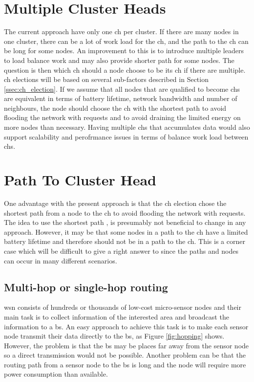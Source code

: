\documentclass[USenglish]{uit-thesis}
\begin{document}
\section{Multiple Cluster Heads} \label{disc:multi_ch}
The current approach have only one \gls{ch} per cluster. If there are many nodes in one cluster, there can be a lot of work load for the \gls{ch}, and the path to the \gls{ch} can be long for some nodes.
An improvement to this is to introduce multiple leaders to load balance work and may also provide shorter path for some nodes. The question is then which \gls{ch} should a node choose to be its \gls{ch} if there are multiple. \gls{ch} elections will be based on several sub-factors described in Section \ref{ssec:ch_election}. If we assume that all nodes that are qualified to become \gls{ch}s are equivalent in terms of battery lifetime, network bandwidth and number of neighbours, the node should choose the \gls{ch} with the shortest path to avoid flooding the network with requests and to avoid draining the limited energy on more nodes than necessary. Having multiple \glspl{ch} that accumulates data would also support scalability and perofrmance issues in terms of balance work load between \glspl{ch}.


\section{Path To Cluster Head} \label{disc:ch_path}
One advantage with the present approach is that the \gls{ch} election chose the shortest path from a node to the \gls{ch} to avoid flooding the network with requests. The idea to use the shortest path \cite{dijkstra}, is presumably not beneficial to change in any approach. However, it may be that some nodes in a path to the \gls{ch} have a limited battery lifetime and therefore should not be in a path to the \gls{ch}. This is a corner case which will be difficult to give a right answer to since the paths and nodes can occur in many different scenarios.



\subsection{Multi-hop or single-hop routing} \label{disc:hopping}

\gls{wsn} consists of hundreds or thousands of low-cost micro-sensor nodes and their main task is to collect information of the interested area and broadcast the information to a \gls{bs}. An easy approach to achieve this task is to make each sensor node transmit their data directly to the \gls{bs}, as Figure \ref{fig:hopping} shows. However, the problem is that the \gls{bs} may be places far away from the sensor node so a direct transmission would not be possible. Another problem can be that the routing path from a sensor node to the \gls{bs} is long and the node will require more power consumption than available.
\end{document}
